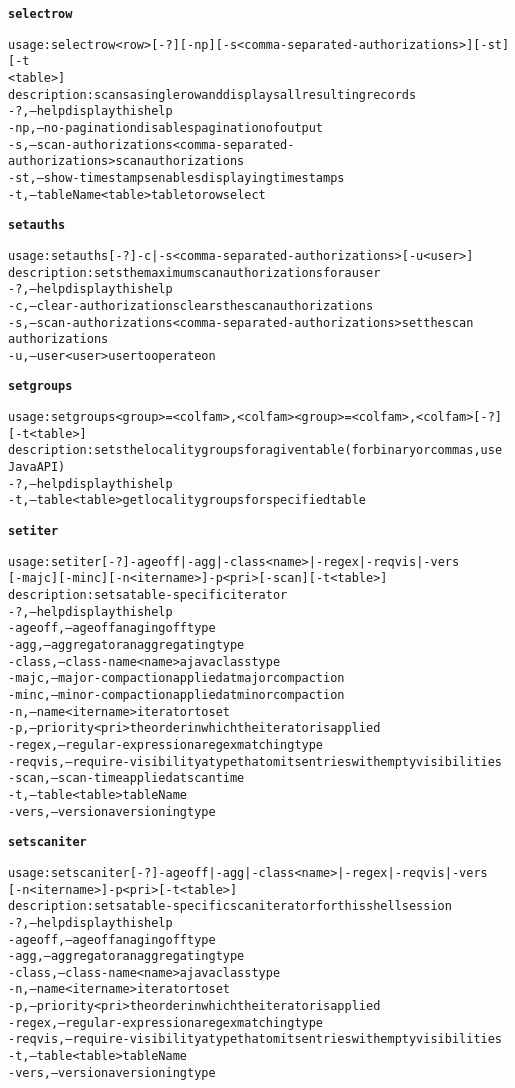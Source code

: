 \begin{alltt}
\textbf{selectrow}

    usage: selectrow <row> [-?] [-np] [-s <comma-separated-authorizations>] [-st] [-t
              <table>]
    description: scans a single row and displays all resulting records
      -?,--help  display this help
      -np,--no-pagination  disables pagination of output
      -s,--scan-authorizations <comma-separated-authorizations>  scan authorizations
      -st,--show-timestamps  enables displaying timestamps
      -t,--tableName <table>  table to row select

\textbf{setauths}

    usage: setauths [-?] -c | -s <comma-separated-authorizations>  [-u <user>]
    description: sets the maximum scan authorizations for a user
      -?,--help  display this help
      -c,--clear-authorizations  clears the scan authorizations
      -s,--scan-authorizations <comma-separated-authorizations>  set the scan
              authorizations
      -u,--user <user>  user to operate on

\textbf{setgroups}

    usage: setgroups <group>=<col fam>{,<col fam>}{ <group>=<col fam>{,<col fam>}} [-?]
              [-t <table>]
    description: sets the locality groups for a given table (for binary or commas, use
              Java API)
      -?,--help  display this help
      -t,--table <table>  get locality groups for specified table

\textbf{setiter}

    usage: setiter [-?] -ageoff | -agg | -class <name> | -regex | -reqvis | -vers 
              [-majc] [-minc] [-n <itername>] -p <pri>  [-scan] [-t <table>]
    description: sets a table-specific iterator
      -?,--help  display this help
      -ageoff,--ageoff  an aging off type
      -agg,--aggregator  an aggregating type
      -class,--class-name <name>  a java class type
      -majc,--major-compaction  applied at major compaction
      -minc,--minor-compaction  applied at minor compaction
      -n,--name <itername>  iterator to set
      -p,--priority <pri>  the order in which the iterator is applied
      -regex,--regular-expression  a regex matching type
      -reqvis,--require-visibility  a type that omits entries with empty visibilities
      -scan,--scan-time  applied at scan time
      -t,--table <table>  tableName
      -vers,--version  a versioning type

\textbf{setscaniter}

    usage: setscaniter [-?] -ageoff | -agg | -class <name> | -regex | -reqvis | -vers 
              [-n <itername>] -p <pri>  [-t <table>]
    description: sets a table-specific scan iterator for this shell session
      -?,--help  display this help
      -ageoff,--ageoff  an aging off type
      -agg,--aggregator  an aggregating type
      -class,--class-name <name>  a java class type
      -n,--name <itername>  iterator to set
      -p,--priority <pri>  the order in which the iterator is applied
      -regex,--regular-expression  a regex matching type
      -reqvis,--require-visibility  a type that omits entries with empty visibilities
      -t,--table <table>  tableName
      -vers,--version  a versioning type


\end{alltt}
